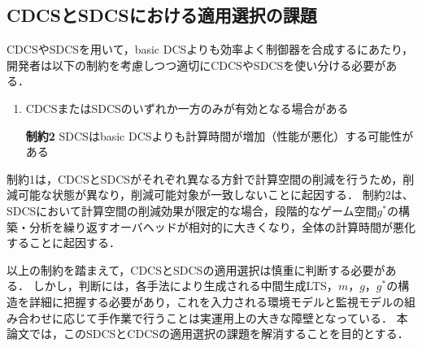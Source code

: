 
\subsection{CDCSとSDCSにおける適用選択の課題}
\label{subsection:limitation}
CDCSやSDCSを用いて，basic DCSよりも効率よく制御器を合成するにあたり，開発者は以下の制約を考慮しつつ適切にCDCSやSDCSを使い分ける必要がある\cite{yamauchi:IPSJ2024}．

\begin{enumerate}[\bf 制約1]
\item CDCSまたはSDCSのいずれか一方のみが有効となる場合がある
\item[\bf 制約2]  SDCSはbasic DCSよりも計算時間が増加（性能が悪化）する可能性がある
\end{enumerate}

制約1は，CDCSとSDCSがそれぞれ異なる方針で計算空間の削減を行うため，削減可能な状態が異なり，削減可能対象が一致しないことに起因する．
制約2は、SDCSにおいて計算空間の削減効果が限定的な場合，段階的なゲーム空間$g^{*}$の構築・分析を繰り返すオーバヘッドが相対的に大きくなり，全体の計算時間が悪化することに起因する．

以上の制約を踏まえて，CDCSとSDCSの適用選択は慎重に判断する必要がある．
しかし，判断には，各手法により生成される中間生成LTS，$m$，$g$，$g^{*}$の構造を詳細に把握する必要があり，これを入力される環境モデルと監視モデルの組み合わせに応じて手作業で行うことは実運用上の大きな障壁となっている．
本論文では，このSDCSとCDCSの適用選択の課題を解消することを目的とする．


